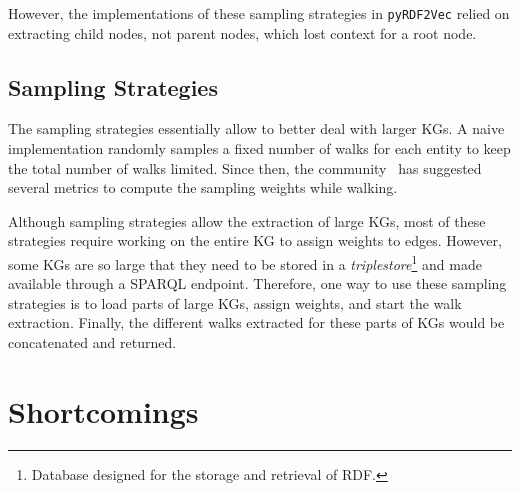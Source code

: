 However, the implementations of these sampling strategies in \texttt{pyRDF2Vec}
relied on extracting child nodes, not parent nodes, which lost context for a
root node.

\subsection{Sampling Strategies}
\label{subsec:rdf2vec:sampling:strategies}

The sampling strategies essentially allow to better deal with larger KGs. A
naive implementation randomly samples a fixed number of walks for each entity to
keep the total number of walks limited. Since then, the
community~\citep{inproceedings:cochez,article:mukherjee,article:taweel} has
suggested several metrics to compute the sampling weights while walking.

Although sampling strategies allow the extraction of large KGs, most of these
strategies require working on the entire KG to assign weights to edges. However,
some KGs are so large that they need to be stored in a
\emph{triplestore}\footnote{Database designed for the storage and retrieval of
RDF.} and made available through a SPARQL endpoint. Therefore, one way to use
these sampling strategies is to load parts of large KGs, assign weights, and
start the walk extraction. Finally, the different walks extracted for these
parts of KGs would be concatenated and returned.

\section{Shortcomings}
\label{sec:rdf2vec:shortcomings}

